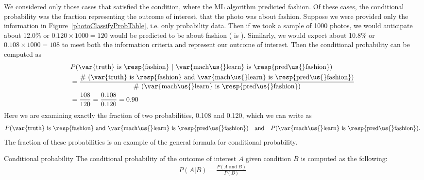 We considered only those cases that satisfied the condition,
where the ML algorithm predicted fashion.
Of these cases, the conditional probability was the
fraction representing the outcome of interest, that the
photo was about fashion.
Suppose we were provided only the information in
Figure~\ref{photoClassifyProbTable}, i.e. only probability data.
Then if we took a sample of 1000 photos, we would anticipate
about 12.0\% or $0.120\times 1000 = 120$ would be predicted to be
about fashion ( is ).
Similarly, we would expect about 10.8\% or
$0.108\times 1000 = 108$ to meet both the information criteria
and represent our outcome of interest.
Then the conditional probability can be computed as
\begin{align*}
&P(\text{\var{truth} is \resp{fashion}}\ |\ 
    \text{\var{mach\us{}learn} is \resp{pred\us{}fashion}}) \\
  &= \frac{\text{\# (\var{truth} is \resp{fashion}
      and \var{mach\us{}learn} is \resp{pred\us{}fashion})}}
    {\text{\# (\var{mach\us{}learn} is \resp{pred\us{}fashion})}} \\
  &= \frac{108}{120}
		= \frac{0.108}{0.120}
		= 0.90
\end{align*}
Here we are examining exactly the fraction of two probabilities,
0.108 and 0.120, which we can write as
\begin{align*}
P(\text{\var{truth} is \resp{fashion} and
    \var{mach\us{}learn} is \resp{pred\us{}fashion}})
\quad\text{and}\quad
P(\text{\var{mach\us{}learn} is \resp{pred\us{}fashion}}).
\end{align*}
The fraction of these probabilities is an example of the
general formula for conditional probability.

\begin{onebox}{Conditional probability}
  The conditional probability of the outcome of interest $A$
  given condition $B$ is computed as the following:
  \begin{align*}
  P(A | B) = \frac{P(A\text{ and }B)}{P(B)}
  \end{align*}
\end{onebox}


